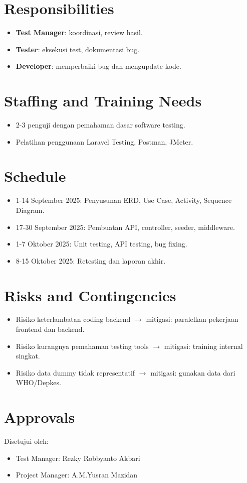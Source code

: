 \documentclass[12pt,a4paper]{article}
\begin{document}
\section{Responsibilities}
\begin{itemize}
    \item \textbf{Test Manager}: koordinasi, review hasil.
    \item \textbf{Tester}: eksekusi test, dokumentasi bug.
    \item \textbf{Developer}: memperbaiki bug dan mengupdate kode.
\end{itemize}

\section{Staffing and Training Needs}
\begin{itemize}
    \item 2-3 penguji dengan pemahaman dasar software testing.
    \item Pelatihan penggunaan Laravel Testing, Postman, JMeter.
\end{itemize}

\section{Schedule}
\begin{itemize}
    \item 1-14 September 2025: Penyusunan ERD, Use Case, Activity, Sequence Diagram.
    \item 17-30 September 2025: Pembuatan API, controller, seeder, middleware.
    \item 1-7 Oktober 2025: Unit testing, API testing, bug fixing.
    \item 8-15 Oktober 2025: Retesting dan laporan akhir.
\end{itemize}

\section{Risks and Contingencies}
\begin{itemize}
    \item Risiko keterlambatan coding backend $\rightarrow$ mitigasi: paralelkan pekerjaan frontend dan backend.
    \item Risiko kurangnya pemahaman testing tools $\rightarrow$ mitigasi: training internal singkat.
    \item Risiko data dummy tidak representatif $\rightarrow$ mitigasi: gunakan data dari WHO/Depkes.
\end{itemize}

\section{Approvals}
Disetujui oleh:
\begin{itemize}
    \item Test Manager: Rezky Robbyanto Akbari
    \item Project Manager: A.M.Yusran Mazidan
\end{itemize}
\end{document}
